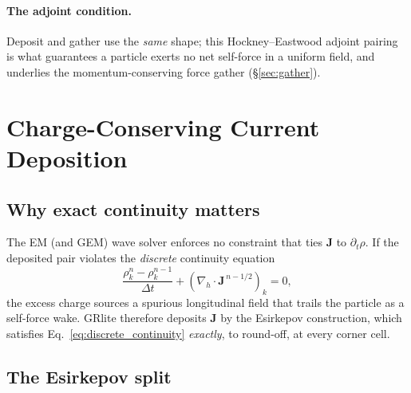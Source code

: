 \documentclass[11pt]{article}
\newcommand{\vv}[1]{\mathbf{#1}}           %
\newcommand{\dt}{\Delta t}                 %
\begin{document}
\paragraph{The adjoint condition.} Deposit and gather use the \emph{same} shape;
this Hockney--Eastwood adjoint pairing is what guarantees a particle exerts no
net self-force in a uniform field, and underlies the momentum-conserving force
gather (\S\ref{sec:gather}).

\section{Charge-Conserving Current Deposition}
\label{sec:esirkepov}

\subsection{Why exact continuity matters}

The EM (and GEM) wave solver enforces no constraint that ties $\vv J$ to
$\partial_t\rho$. If the deposited pair violates the \emph{discrete} continuity
equation
\begin{equation}
\label{eq:discrete_continuity}
  \frac{\rho^{n}_k-\rho^{n-1}_k}{\dt} + (\nabla_h\!\cdot\vv J^{\,n-1/2})_k = 0,
\end{equation}
the excess charge sources a spurious longitudinal field that trails the particle
as a self-force wake. GRlite therefore deposits $\vv J$ by the Esirkepov
construction, which satisfies Eq.~\eqref{eq:discrete_continuity} \emph{exactly},
to round-off, at every corner cell.

\subsection{The Esirkepov split}
\end{document}
